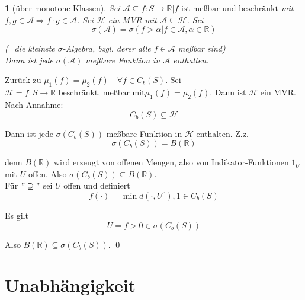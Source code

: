 \documentclass[10pt,a4paper]{report}
\numberwithin{equation}{section}
\numberwithin{figure}{section}
\theoremstyle{plain}
\theoremstyle{definition}
\theoremstyle{remark}
\theoremstyle{plain}
\newtheorem{prop}[thm]{\protect\propositionname}
\providecommand{\propositionname}{Satz}
\newcommand{\1}{ \mathbb{1} } %
\begin{document}
\begin{prop}[über monotone Klassen]
  Sei $\mathcal{A}\subseteq{f:S\to\mathbb{R}|f\text{ ist meßbar und
      beschränkt}}$ mit $f,g\in\mathcal{A}\Rightarrow f\cdot
  g\in\mathcal{A}$. Sei $\mathcal{H}$ ein MVR mit
  $\mathcal{A}\subseteq\mathcal{H}$. Sei
  \[
  \sigma(\mathcal{A})=\sigma({f>\alpha|f\in\mathcal{A},\alpha\in\mathbb{R}})
  \]

  (=die kleinste $\sigma$-Algebra, bzgl. derer alle $f\in\mathcal{A}$
  meßbar sind)\\
  Dann ist jede $\sigma(\mathcal{A})$ meßbare Funktion in
  $\mathcal{A}$
  enthalten.
\end{prop}

Zurück zu $\mu_{1}(f)=\mu_{2}(f)\quad\forall f\in C_{b}(S)$. Sei
$\mathcal{H}={f:S\to\mathbb{R}\text{ beschränkt, meßbar mit}\mu_{1}(f)=\mu_{2}(f)}$.
Dann ist $\mathcal{H}$ ein MVR. Nach Annahme:
\[
C_{b}(S)\subseteq\mathcal{H}
\]

Dann ist jede $\sigma(C_{b}(S))$-meßbare Funktion in $\mathcal{H}$
enthalten. Z.z.
\[
\sigma(C_{b}(S))=B(\mathbb{R})
\]

denn $B(\mathbb{R})$ wird erzeugt von offenen Mengen, also von Indikator-Funktionen
$1_{U}$mit $U$ offen. Also $\sigma(C_{b}(S))\subseteq B(\mathbb{R})$.\\

Für $"\supseteq"$ sei $U$ offen und definiert
\[
f(\cdot)=\min{d(\cdot,U^{c}),1}\in C_{b}(S)
\]

Es gilt 
\[
U={f>0}\in\sigma(C_{b}(S))
\]

Also $B(\mathbb{R})\subseteq\sigma(C_{b}(S))$. \qed

\chapter{Unabhängigkeit}
\end{document}
